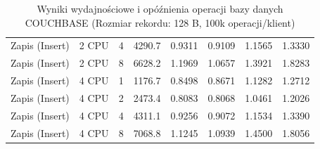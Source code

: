\begin{table}[ht]
{\begin{tabular}{llcrrrrr}
Zapis (Insert) & 2 CPU & 4 & 4290.7 & 0.9311 & 0.9109 & 1.1565 & 1.3330 \\
Zapis (Insert) & 2 CPU & 8 & 6628.2 & 1.1969 & 1.0657 & 1.3921 & 1.8283 \\
Zapis (Insert) & 4 CPU & 1 & 1176.7 & 0.8498 & 0.8671 & 1.1282 & 1.2712 \\
Zapis (Insert) & 4 CPU & 2 & 2473.4 & 0.8083 & 0.8068 & 1.0461 & 1.2026 \\
Zapis (Insert) & 4 CPU & 4 & 4311.1 & 0.9256 & 0.9072 & 1.1534 & 1.3390 \\
Zapis (Insert) & 4 CPU & 8 & 7068.8 & 1.1245 & 1.0939 & 1.4500 & 1.8056 \\
\bottomrule
\end{tabular}%
}
\caption{Wyniki wydajnościowe i opóźnienia operacji bazy danych COUCHBASE (Rozmiar rekordu: 128 B, 100k operacji/klient)}
\label{tab:latency_couchbase_small_100000}
\end{table}
